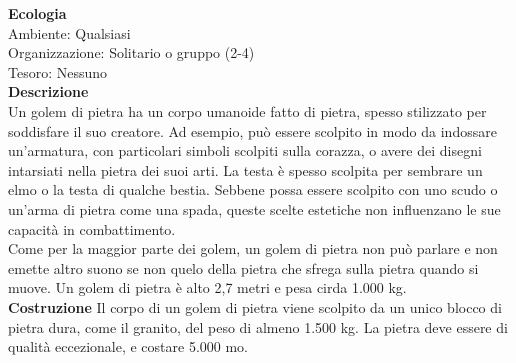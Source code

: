 \begin{multicols}{2}
\textbf{Ecologia}\\
Ambiente: Qualsiasi\\
Organizzazione: Solitario o gruppo (2-4)\\
Tesoro: Nessuno\\
\textbf{Descrizione}\\
Un golem di pietra ha un corpo umanoide fatto di pietra, spesso stilizzato per soddisfare il suo creatore. Ad esempio, può essere scolpito in modo da indossare un'armatura, con particolari simboli scolpiti sulla corazza, o avere dei disegni intarsiati nella pietra dei suoi arti. La testa è spesso scolpita per sembrare un elmo o la testa di qualche bestia. Sebbene possa essere scolpito con uno scudo o un'arma di pietra come una spada, queste scelte estetiche non influenzano le sue capacità in combattimento.\\

Come per la maggior parte dei golem, un golem di pietra non può parlare e non emette altro suono se non quelo della pietra che sfrega sulla pietra quando si muove. Un golem di pietra è alto 2,7 metri e pesa cirda 1.000 kg.\\

\textbf{Costruzione}
Il corpo di un golem di pietra viene scolpito da un unico blocco di pietra dura, come il granito, del peso di almeno 1.500 kg. La pietra deve essere di qualità eccezionale, e costare 5.000 mo.\\


\end{multicols}
